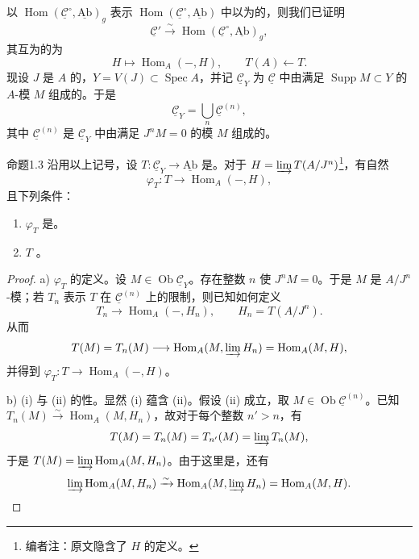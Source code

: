 以 $\operatorname{Hom}(\underline{\mathcal C}^{\circ},\underline{\mathrm{Ab}})_g$ 表示 $\operatorname{Hom}(\underline{\mathcal C}^{\circ},\underline{\mathrm{Ab}})$ 中以为的，则我们已证明
\[\underline{\mathcal C}'\xrightarrow{\sim}\operatorname{Hom}(\underline{\mathcal C}^{\circ},\underline{\mathrm{Ab}})_g,\]
其互为的为
\[H\longmapsto\operatorname{Hom}_A(-,H),\qquad T(A)\longleftarrow T.\]
现设 $J$ 是 $A$ 的，$Y=V(J)\subset\operatorname{Spec}A$，并记 $\underline{\mathcal C}_Y$ 为 $\underline{\mathcal C}$ 中由满足 $\operatorname{Supp}M\subset Y$ 的 $A$-模 $M$ 组成的。于是
\[\underline{\mathcal C}_Y=\bigcup_n\underline{\mathcal C}^{(n)},\]
其中 $\underline{\mathcal C}^{(n)}$ 是 $\underline{\mathcal C}_Y$ 中由满足 $J^nM=0$ 的模 $M$ 组成的。
\begin{SGAresult}{命题}{1.3}
沿用以上记号，设 $T:\underline{\mathcal C}_Y\to\underline{\mathrm{Ab}}$ 是。对于 $H=\varinjlim T(A/J^n)$\footnote[1]{编者注：原文隐含了 $H$ 的定义。}，有自然
\[\varphi_T:T\longrightarrow\operatorname{Hom}_A(-,H),\]
且下列条件：
\begin{enumerate}
\item[(i)] $\varphi_T$ 是。
\item[(ii)]  $T$ 。
\end{enumerate}
\end{SGAresult}
\begin{proof}
a) $\varphi_T$ 的定义。设 $M\in\operatorname{Ob}\underline{\mathcal C}_Y$。存在整数 $n$ 使 $J^nM=0$。于是 $M$ 是 $A/J^n$-模；若 $T_n$ 表示 $T$ 在 $\underline{\mathcal C}^{(n)}$ 上的限制，则已知如何定义
\[T_n\longrightarrow\operatorname{Hom}_A(-,H_n),\qquad H_n=T(A/J^n).\]
从而
\[T(M)=T_n(M)\longrightarrow\operatorname{Hom}_A(M,\varinjlim H_n)=\operatorname{Hom}_A(M,H),\]
并得到 $\varphi_T:T\to\operatorname{Hom}_A(-,H)$。

b) (i) 与 (ii) 的性。显然 (i) 蕴含 (ii)。假设 (ii) 成立，取 $M\in\operatorname{Ob}\underline{\mathcal C}^{(n)}$。已知 $T_n(M)\xrightarrow{\sim}\operatorname{Hom}_A(M,H_n)$，故对于每个整数 $n'>n$，有
\[T(M)=T_n(M)=T_{n'}(M)=\varinjlim T_n(M),\]
于是 $T(M)=\varinjlim\operatorname{Hom}_A(M,H_n)$。由于这里是，还有
\[\varinjlim\operatorname{Hom}_A(M,H_n)\xrightarrow{\sim}\operatorname{Hom}_A(M,\varinjlim H_n)=\operatorname{Hom}_A(M,H).\]
\end{proof}
